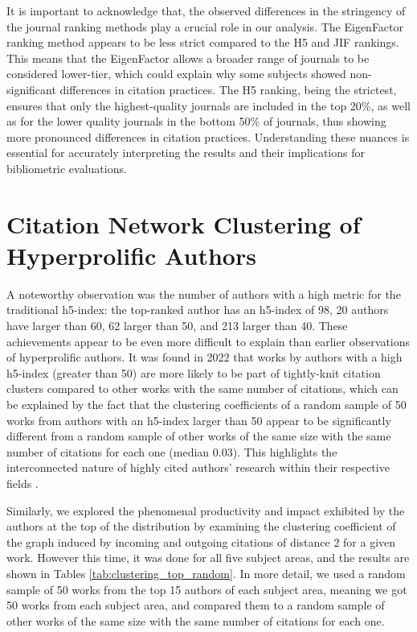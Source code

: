 It is important to acknowledge that, the observed differences in the stringency of
the journal ranking methods play a crucial role in our analysis. The
EigenFactor ranking method appears to be less strict compared to the H5 and JIF
rankings. This means that the EigenFactor allows a broader range of journals to
be considered lower-tier, which could explain why some subjects showed
non-significant differences in citation practices. The H5 ranking, being the
strictest, ensures that only the highest-quality journals are included in the
top 20\%, as well as for the lower quality journals in the bottom 50\% of
journals, thus showing more pronounced differences in citation practices.
Understanding these nuances is essential for accurately interpreting the
results and their implications for bibliometric evaluations.

\section{Citation Network Clustering of Hyperprolific Authors}

A noteworthy observation was the number of authors with a high metric for the
traditional h5-index: the top-ranked author has an h5-index of 98, 20 authors
have larger than 60, 62 larger than 50, and 213 larger than 40. These
achievements appear to be even more difficult to explain than earlier
observations of hyperprolific authors. It was found in 2022 that works by
authors with a high h5-index (greater than 50) are more likely to be part of
tightly-knit citation clusters compared to other works with the same number of
citations, which can be explained by the fact that the clustering coefficients
of a random sample of 50 works from authors with an h5-index larger than 50
appear to be significantly different from a random sample of other works of the
same size with the same number of citations for each one (median 0.03). This
highlights the interconnected nature of highly cited authors' research within
their respective fields \cite{Spi23g}.%

Similarly, we explored the phenomenal productivity and impact exhibited by the
authors at the top of the distribution by examining the clustering coefficient
of the graph induced by incoming and outgoing citations of distance 2 for a
given work. However this time, it was done for all five subject areas, and the
results are shown in Tables \ref{tab:clustering_top_random}. In more detail, we
used a random sample of 50 works from the top 15 authors of each subject area,
meaning we got 50 works from each subject area, and compared them to a random
sample of other works of the same size with the same number of citations for
each one. %

